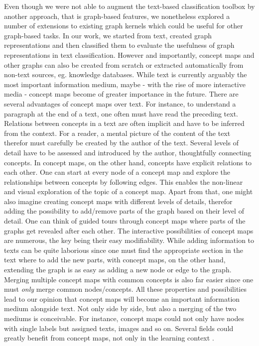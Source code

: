 Even though we were not able to augment the text-based classification toolbox by another approach, that is graph-based features, we nonetheless explored a number of extensions to existing graph kernels which could be useful for other graph-based tasks.
In our work, we started from text, created graph representations and then classified them to evaluate the usefulness of graph representations in text classification.
However and importantly, concept maps and other graphs can also be created from scratch or extracted automatically from non-text sources, eg. knowledge databases.
While text is currently arguably the most important information medium, maybe - with the rise of more interactive media - concept maps become of greater importance in the future.
There are several advantages of concept maps over text.
For instance, to understand a paragraph at the end of a text, one often must have read the preceding text.
Relations between concepts in a text are often implicit and have to be inferred from the context.
For a reader, a mental picture of the content of the text therefor must carefully be created by the author of the text.
Several levels of detail have to be assessed and introduced by the author, thoughtfully connecting concepts.
In concept maps, on the other hand, concepts have explicit relations to each other.
One can start at every node of a concept map and explore the relationships between concepts by following edges.
This enables the non-linear and visual exploration of the topic of a concept map.
Apart from that, one might also imagine creating concept maps with different levels of details, therefor adding the possibility to add/remove parts of the graph based on their level of detail.
One can think of guided tours through concept maps where parts of the graphs get revealed after each other.
The interactive possibilities of concept maps are numerous, the key being their easy modifiability.
While adding information to texts can be quite laborious since one must find the appropriate section in the text where to add the new parts, with concept maps, on the other hand, extending the graph is as easy as adding a new node or edge to the graph.
Merging multiple concept maps with common concepts is also far easier since one must \textit{only} merge common nodes/concepts.
All these properties and possibilities lead to our opinion that concept maps will become an important information medium alongside text.
Not only side by side, but also a merging of the two mediums is conceivable.
For instance, concept maps could not only have nodes with single labels but assigned texts, images and so on.
Several fields could greatly benefit from concept maps, not only in the learning context \cite{Novak1984}.

